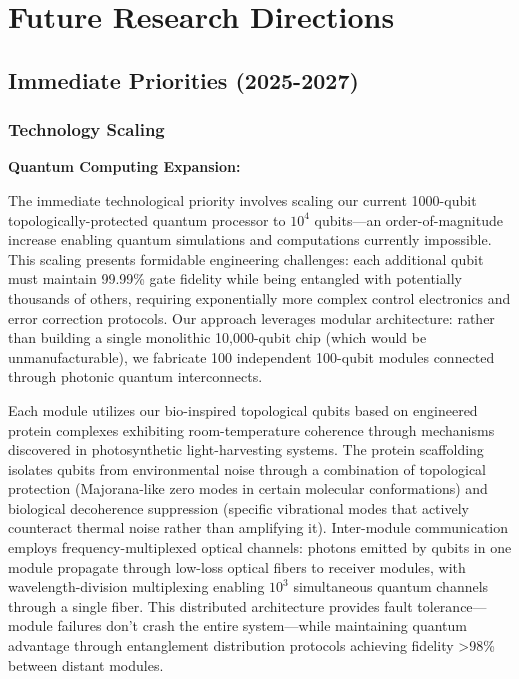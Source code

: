 \documentclass[11pt,a4paper,twoside]{article}
\begin{document}
\section{Future Research Directions}

\subsection{Immediate Priorities (2025-2027)}

\subsubsection{Technology Scaling}

\textbf{Quantum Computing Expansion:}

The immediate technological priority involves scaling our current 1000-qubit topologically-protected quantum processor to $10^4$ qubits—an order-of-magnitude increase enabling quantum simulations and computations currently impossible. This scaling presents formidable engineering challenges: each additional qubit must maintain 99.99\% gate fidelity while being entangled with potentially thousands of others, requiring exponentially more complex control electronics and error correction protocols. Our approach leverages modular architecture: rather than building a single monolithic 10,000-qubit chip (which would be unmanufacturable), we fabricate 100 independent 100-qubit modules connected through photonic quantum interconnects.

Each module utilizes our bio-inspired topological qubits based on engineered protein complexes exhibiting room-temperature coherence through mechanisms discovered in photosynthetic light-harvesting systems. The protein scaffolding isolates qubits from environmental noise through a combination of topological protection (Majorana-like zero modes in certain molecular conformations) and biological decoherence suppression (specific vibrational modes that actively counteract thermal noise rather than amplifying it). Inter-module communication employs frequency-multiplexed optical channels: photons emitted by qubits in one module propagate through low-loss optical fibers to receiver modules, with wavelength-division multiplexing enabling $10^3$ simultaneous quantum channels through a single fiber. This distributed architecture provides fault tolerance—module failures don't crash the entire system—while maintaining quantum advantage through entanglement distribution protocols achieving fidelity >98\% between distant modules.
\end{document}
